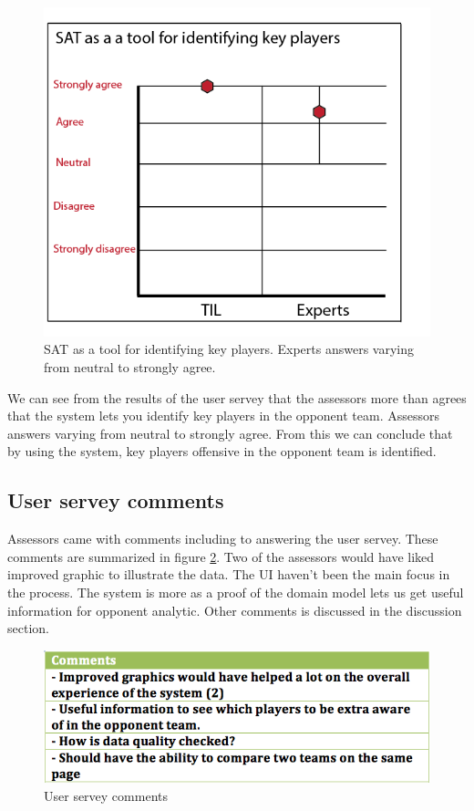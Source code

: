 \begin{figure}[ht!]
\centering
\includegraphics[width=1\textwidth]{images/evaluation/user_servery2}
\caption{SAT as a tool for identifying key players. Experts answers varying from neutral to strongly agree.}
\label{fig:user_servery2}
\end{figure}

We can see from the results of the user servey that the assessors more than agrees that the system lets you identify key players in the opponent team. Assessors answers varying from neutral to strongly agree. From this we can conclude that by using the system, key players offensive in the opponent team is identified.

\subsection{User servey comments}
Assessors came with comments including to answering the user servey. These comments are summarized in figure \ref{fig:comments}. Two of the assessors would have liked improved graphic to illustrate the data. The \ac{UI} haven't been the main focus in the process. The system is more as a proof of the domain model lets us get useful information for opponent analytic. Other comments is discussed in the discussion section.

\begin{figure}[ht!]
\centering
\includegraphics[width=1\textwidth]{images/evaluation/comments}
\caption{User servey comments}
\label{fig:comments}
\end{figure}


